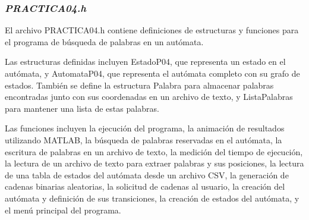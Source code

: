 \documentclass{article}
\begin{document}
        \subsubsection{\textit{PRACTICA04.h}}
        El archivo PRACTICA04.h contiene definiciones de estructuras y funciones para el programa de búsqueda de palabras en un
        autómata.

        Las estructuras definidas incluyen EstadoP04, que representa un estado en el autómata, y AutomataP04, que representa el
        autómata completo con su grafo de estados. También se define la estructura Palabra para almacenar palabras encontradas junto
        con sus coordenadas en un archivo de texto, y ListaPalabras para mantener una lista de estas palabras.

        Las funciones incluyen la ejecución del programa, la animación de resultados utilizando MATLAB, la búsqueda de palabras
        reservadas en el autómata, la escritura de palabras en un archivo de texto, la medición del tiempo de ejecución, la lectura
        de un archivo de texto para extraer palabras y sus posiciones, la lectura de una tabla de estados del autómata desde un
        archivo CSV, la generación de cadenas binarias aleatorias, la solicitud de cadenas al usuario, la creación del autómata y
        definición de sus transiciones, la creación de estados del autómata, y el menú principal del programa.
\end{document}
